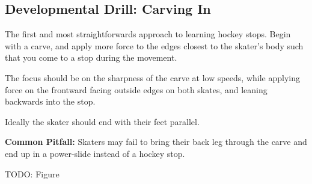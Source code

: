 \subsection*{Developmental Drill: Carving In} 

The first and most straightforwards approach to learning hockey stops.
Begin with a carve, and apply more force to the edges closest to the skater's body such that you come to a stop during the movement.   

The focus should be on the sharpness of the carve at low speeds, while applying force on the frontward facing outside edges on both skates, and leaning backwards into the stop. 

Ideally the skater should end with their feet parallel.

{\bf Common Pitfall:} Skaters may fail to bring their back leg through the carve and end up in a power-slide instead of a hockey stop. 

{\color{red} TODO: Figure}



